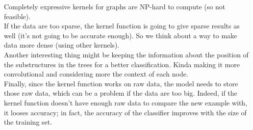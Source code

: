 Completely expressive kernels for graphs are NP-hard to compute (so not
feasible).\\
If the data are too sparse, the kernel function is going to give sparse results
as well (it's not going to be accurate enough). So we think about a way to make
data more dense (using other kernels).\\
Another interesting thing might be keeping the information about the position of
the substructures in the trees for a better classification. Kinda making it more
convolutional and considering more the context of each node.\\
Finally, since the kernel function works on raw data, the model needs to store
those raw data, which can be a problem if the data are too big. Indeed, if the
kernel function doesn't have enough raw data to compare the new example with, it
looses accuracy; in fact, the accuracy of the classifier improves with the size
of the training set.
